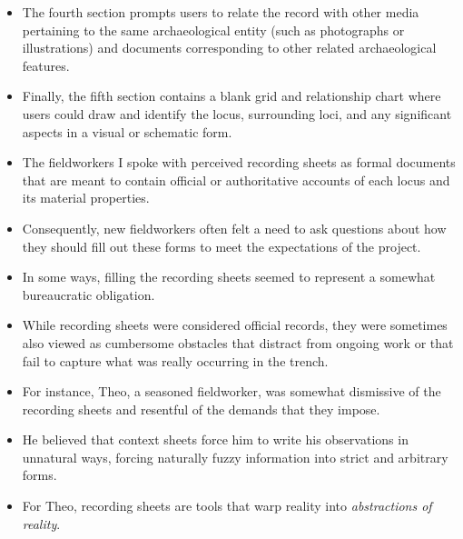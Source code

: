 \documentclass{article}
\begin{document}
\begin{itemize}
  \item The fourth section prompts users to relate the record with other media pertaining to the same archaeological entity (such as photographs or illustrations) and documents corresponding to other related archaeological features.
  
  \item Finally, the fifth section contains a blank grid and relationship chart where users could draw and identify the locus, surrounding loci, and any significant aspects in a visual or schematic form.
  
  \item The fieldworkers I spoke with perceived recording sheets as formal documents that are meant to contain official or authoritative accounts of each locus and its material properties.
  \item Consequently, new fieldworkers often felt a need to ask questions about how they should fill out these forms to meet the expectations of the project.
  \item In some ways, filling the recording sheets seemed to represent a somewhat bureaucratic obligation.
  
  \item While recording sheets were considered official records, they were sometimes also viewed as cumbersome obstacles that distract from ongoing work or that fail to capture what was really occurring in the trench.
  \item For instance, Theo, a seasoned fieldworker, was somewhat dismissive of the recording sheets and resentful of the demands that they impose.
  \item He believed that context sheets force him to write his observations in unnatural ways, forcing naturally fuzzy information into strict and arbitrary forms.
  \item For Theo, recording sheets are tools that warp reality into \emph{abstractions of reality}.
\end{itemize}
\end{document}
